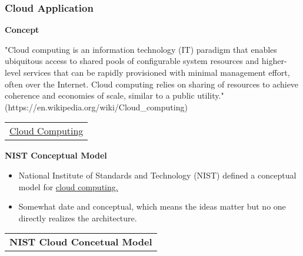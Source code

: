 \documentclass[11pt]{article}
\begin{document}
    \subsubsection{Cloud Application}\label{cloud-application}

\textbf{Concept}

    "Cloud computing is an information technology (IT) paradigm that enables
ubiquitous access to shared pools of configurable system resources and
higher-level services that can be rapidly provisioned with minimal
management effort, often over the Internet. Cloud computing relies on
sharing of resources to achieve coherence and economies of scale,
similar to a public utility."
(https://en.wikipedia.org/wiki/Cloud\_computing)

\begin{longtable}[]{@{}c@{}}
\toprule
\tabularnewline
\midrule
\endhead
\href{https://en.wikipedia.org/wiki/Cloud_computing}{Cloud
Computing}\tabularnewline
\bottomrule
\end{longtable}

\textbf{NIST Conceptual Model}

\begin{itemize}
\item
  National Institute of Standards and Technology (NIST) defined a
  conceptual model for
  \href{https://ws680.nist.gov/publication/get_pdf.cfm?pub_id=909505}{cloud
  computing.}
\item
  Somewhat date and conceptual, which means the ideas matter but no one
  directly realizes the architecture.
\end{itemize}

\begin{longtable}[]{@{}c@{}}
\toprule
\tabularnewline
\midrule
\endhead
\textbf{NIST Cloud Concetual Model}\tabularnewline
\bottomrule
\end{longtable}
\end{document}
